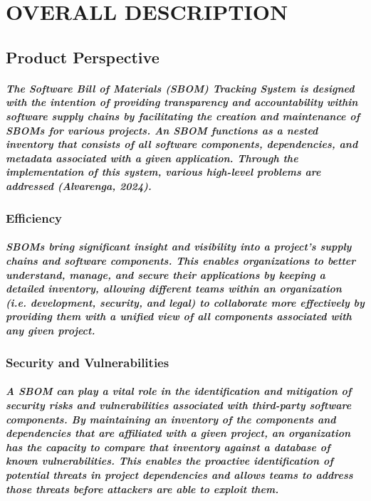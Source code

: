 \documentclass[letterpaper,12pt,oneside,listof=totoc]{scrreprt}
\begin{document}


\chapter{OVERALL DESCRIPTION}

\section{Product Perspective}

\paragraph{ \normalfont
The Software Bill of Materials (SBOM) Tracking System is designed with the intention of providing transparency and accountability within software supply chains by facilitating the creation and maintenance of SBOMs for various projects. An SBOM functions as a nested inventory that consists of all software components, dependencies, and metadata associated with a given application. Through the implementation of this system, various high-level problems are addressed (Alvarenga, 2024).
}

\subsection{Efficiency}
    \paragraph{ \normalfont
    SBOMs bring significant insight and visibility into a project’s supply chains and software components. This enables organizations to better understand, manage, and secure their applications by keeping a detailed inventory, allowing different teams within an organization (i.e. development, security, and legal) to collaborate more effectively by providing them with a unified view of all components associated with any given project. 
    }
\subsection{Security and Vulnerabilities}
    \paragraph{ \normalfont
    A SBOM can play a vital role in the identification and mitigation of security risks and vulnerabilities associated with third-party software components. By maintaining an inventory of the components and dependencies that are affiliated with a given project, an organization has the capacity to compare that inventory against a database of known vulnerabilities. This enables the proactive identification of potential threats in project dependencies and allows teams to address those threats before attackers are able to exploit them.
}
\end{document}
